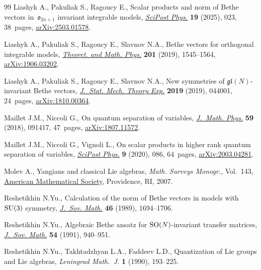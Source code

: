 \begin{thebibliography}{99}
Liashyk A., Pakuliak S., Ragoucy E., Scalar products and norm of {B}ethe
 vectors in~{$\mathfrak{o}_{2n+1}$} invariant integrable models,
 \href{https://doi.org/10.21468/SciPostPhys.19.1.023}{\textit{SciPost Phys.}}
 \textbf{19} (2025), 023, 38~pages,
 \href{http://arxiv.org/abs/2503.01578}{arXiv:2503.01578}.

Liashyk A., Pakuliak S., Ragoucy E., Slavnov N.A., Bethe vectors for orthogonal
 integrable models,
 \href{https://doi.org/10.1134/S0040577919110023}{\textit{Theoret. and Math.
 Phys.}} \textbf{201} (2019), 1545--1564,
 \href{http://arxiv.org/abs/1906.03202}{arXiv:1906.03202}.

Liashyk A., Pakuliak S., Ragoucy E., Slavnov N.A., New symmetries of
 {$\mathfrak{gl}(N)$}-invariant {B}ethe vectors,
 \href{https://doi.org/10.1088/1742-5468/ab02f0}{\textit{J.~Stat. Mech. Theory
 Exp.}} \textbf{2019} (2019), 044001, 24~pages,
 \href{http://arxiv.org/abs/1810.00364}{arXiv:1810.00364}.

Maillet J.M., Niccoli G., On quantum separation of variables,
 \href{https://doi.org/10.1063/1.5050989}{\textit{J.~Math. Phys.}} \textbf{59}
 (2018), 091417, 47~pages,
 \href{http://arxiv.org/abs/1807.11572}{arXiv:1807.11572}.

Maillet J.M., Niccoli G., Vignoli L., On scalar products in higher rank quantum
 separation of variables,
 \href{https://doi.org/10.21468/SciPostPhys.9.6.086}{\textit{SciPost Phys.}}
 \textbf{9} (2020), 086, 64~pages,
 \href{http://arxiv.org/abs/2003.04281}{arXiv:2003.04281}.

Molev A., Yangians and classical {L}ie algebras, \textit{Math. Surveys
 Monogr.}, Vol.~143, \href{https://doi.org/10.1090/surv/143}{American
 Mathematical Society}, Providence, RI, 2007.

Reshetikhin N.Yu., Calculation of the norm of {B}ethe vectors in models
 with~{${\rm SU}(3)$} symmetry,
 \href{https://doi.org/10.1007/BF01099200}{\textit{J.~Sov. Math.}} \textbf{46}
 (1989), 1694--1706.

Reshetikhin N.Yu., Algebraic {B}ethe ansatz for {${\rm SO}(N)$}-invariant
 transfer matrices, \href{https://doi.org/10.1007/BF01101125}{\textit{J.~Sov.
 Math.}} \textbf{54} (1991), 940--951.

Reshetikhin N.Yu., Takhtadzhyan L.A., Faddeev L.D., Quantization of {L}ie groups
 and {L}ie algebras, \textit{Leningrad Math.~J.} \textbf{1} (1990), 193--225.


\end{thebibliography}
